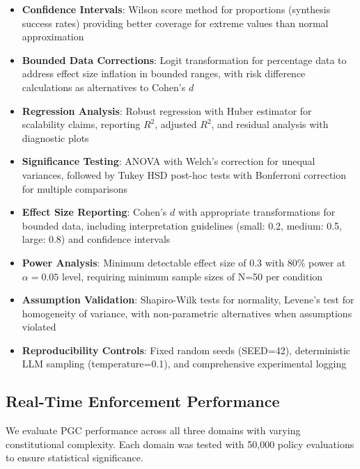 \documentclass[sigconf,natbib]{acmart}
\begin{document}
\begin{itemize}
    \item \textbf{Confidence Intervals}: Wilson score method for proportions (synthesis success rates) providing better coverage for extreme values than normal approximation
    \item \textbf{Bounded Data Corrections}: Logit transformation for percentage data to address effect size inflation in bounded ranges, with risk difference calculations as alternatives to Cohen's $d$
    \item \textbf{Regression Analysis}: Robust regression with Huber estimator for scalability claims, reporting $R^2$, adjusted $R^2$, and residual analysis with diagnostic plots
    \item \textbf{Significance Testing}: ANOVA with Welch's correction for unequal variances, followed by Tukey HSD post-hoc tests with Bonferroni correction for multiple comparisons
    \item \textbf{Effect Size Reporting}: Cohen's $d$ with appropriate transformations for bounded data, including interpretation guidelines (small: 0.2, medium: 0.5, large: 0.8) and confidence intervals
    \item \textbf{Power Analysis}: Minimum detectable effect size of 0.3 with 80\% power at $\alpha = 0.05$ level, requiring minimum sample sizes of N=50 per condition
    \item \textbf{Assumption Validation}: Shapiro-Wilk tests for normality, Levene's test for homogeneity of variance, with non-parametric alternatives when assumptions violated
    \item \textbf{Reproducibility Controls}: Fixed random seeds (SEED=42), deterministic LLM sampling (temperature=0.1), and comprehensive experimental logging
\end{itemize}

\subsection{Real-Time Enforcement Performance}
\label{subsec:pgc_performance}

We evaluate PGC performance across all three domains with varying constitutional complexity. Each domain was tested with 50,000 policy evaluations to ensure statistical significance.
\end{document}
